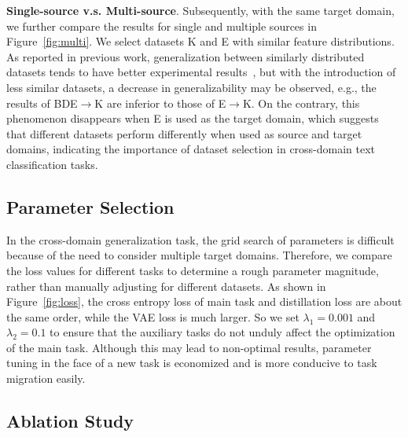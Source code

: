 \documentclass[letterpaper]{article} %
\begin{document}
\textbf{Single-source v.s. Multi-source}. Subsequently, with the same target domain, we further compare the results for single and multiple sources in Figure~\ref{fig:multi}. We select datasets K and E with similar feature distributions. As reported in previous work, generalization between similarly distributed datasets tends to have better experimental results~\cite{WuS22}, but with the introduction of less similar datasets, a decrease in generalizability may be observed, e.g., the results of BDE$\to$K are inferior to those of E$\to$K. On the contrary, this phenomenon disappears when E is used as the target domain, which suggests that different datasets perform differently when used as source and target domains, indicating the importance of dataset selection in cross-domain text classification tasks. 


\subsection{Parameter Selection}\label{sec:params}

In the cross-domain generalization task, the grid search of parameters is difficult because of the need to consider multiple target domains. Therefore, we compare the loss values for different tasks to determine a rough parameter magnitude, rather than manually adjusting for different datasets. As shown in Figure~\ref{fig:loss}, the cross entropy loss of main task and distillation loss are about the same order, while the VAE loss is much larger. So we set $\lambda_1=0.001$ and $\lambda_2=0.1$ to ensure that the auxiliary tasks do not unduly affect the optimization of the main task. Although this may lead to non-optimal results, parameter tuning in the face of a new task is economized and is more conducive to task migration easily.


\subsection{Ablation Study}\label{sec:abl}
\end{document}
